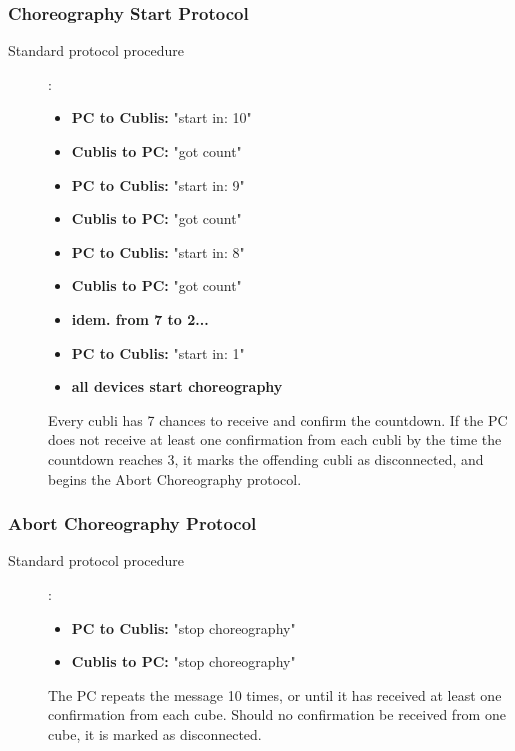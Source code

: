 \subsubsection{Choreography Start Protocol}

\begin{description}
\item[Standard protocol procedure]:

\begin{itemize}
\item[] \textbf{PC to Cublis:} "start in: 10"
\item[] \textbf{Cublis to PC:} "got count"
\item[] \textbf{PC to Cublis:} "start in:  9"
\item[] \textbf{Cublis to PC:} "got count"
\item[] \textbf{PC to Cublis:} "start in:  8"
\item[] \textbf{Cublis to PC:} "got count"
\item[] \textbf{idem. from 7 to 2...}
\item[] \textbf{PC to Cublis:} "start in:  1"
\item[] \textbf{all devices start choreography}
\end{itemize}

Every cubli has 7 chances to receive and confirm the countdown. If the PC does not receive at least one confirmation from each cubli by the time the countdown reaches 3, it marks the offending cubli as disconnected, and begins the Abort Choreography protocol.

\end{description}

\subsubsection{Abort Choreography Protocol}

\begin{description}
\item[Standard protocol procedure]:

\begin{itemize}
\item[] \textbf{PC to Cublis:} "stop choreography"
\item[] \textbf{Cublis to PC:} "stop choreography"
\end{itemize}

The PC repeats the message 10 times, or until it has received at least one confirmation from each cube. Should no confirmation be received from one cube, it is marked as disconnected.

\end{description}

